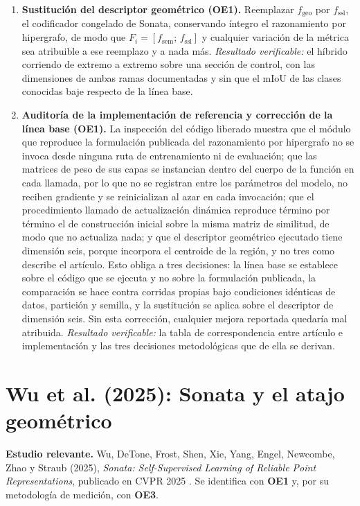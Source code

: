 \begin{enumerate}
\item[\textbf{A1}] \textbf{Sustitución del descriptor geométrico (OE1).} Reemplazar $f_{\text{geo}}$ por
$f_{\mathrm{ssl}}$, el codificador congelado de Sonata, conservando íntegro el
razonamiento por hipergrafo, de modo que
$F_i = [f_{\mathrm{sem}};\, f_{\mathrm{ssl}}]$ y cualquier variación de
la métrica sea atribuible a ese reemplazo y a nada más.
\emph{Resultado verificable:} el híbrido corriendo de extremo a extremo sobre una
sección de control, con las dimensiones de ambas ramas documentadas y sin que el
mIoU de las clases conocidas baje respecto de la línea base.

\item[\textbf{A2}] \textbf{Auditoría de la implementación de referencia y
corrección de la línea base (OE1).} La inspección del código liberado muestra
que el módulo que reproduce la formulación publicada del razonamiento por
hipergrafo no se invoca desde ninguna ruta de entrenamiento ni de evaluación;
que las matrices de peso de sus capas se instancian dentro del cuerpo de la
función en cada llamada, por lo que no se registran entre los parámetros del
modelo, no reciben gradiente y se reinicializan al azar en cada invocación; que
el procedimiento llamado de actualización dinámica reproduce término por término
el de construcción inicial sobre la misma matriz de similitud, de modo que no
actualiza nada; y que el descriptor geométrico ejecutado tiene dimensión seis,
porque incorpora el centroide de la región, y no tres como describe el artículo.
Esto obliga a tres decisiones: la línea base se establece sobre el código que se
ejecuta y no sobre la formulación publicada, la comparación se hace contra
corridas propias bajo condiciones idénticas de datos, partición y semilla, y la
sustitución se aplica sobre el descriptor de dimensión seis. Sin esta corrección,
cualquier mejora reportada quedaría mal atribuida. \emph{Resultado verificable:}
la tabla de correspondencia entre artículo e implementación y las tres decisiones
metodológicas que de ella se derivan.
\end{enumerate}

\section[Sonata]{Wu et al. (2025): Sonata y el atajo geométrico}
\label{sec:sonata}

\textbf{Estudio relevante.} Wu, DeTone, Frost, Shen, Xie, Yang, Engel, Newcombe,
Zhao y Straub (2025), \emph{Sonata: Self-Supervised Learning of Reliable Point
Representations}, publicado en CVPR 2025 \cite{wu2025sonata}. Se identifica con
\textbf{OE1} y, por su metodología de medición, con \textbf{OE3}.

